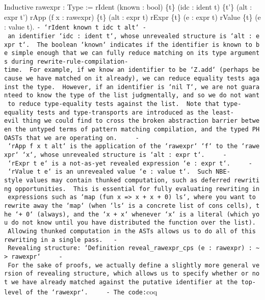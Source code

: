 Inductive rawexpr : Type := \textbar{} rIdent (known : bool) \{t\} (idc
: ident t) \{t'\} (alt : expr t') \textbar{} rApp (f x : rawexpr) \{t\}
(alt : expr t) \textbar{} rExpr \{t\} (e : expr t) \textbar{} rValue
\{t\} (e : value t).
\texttt{-\ `rIdent\ known\ t\ idc\ t\textquotesingle{}\ alt`\ -\ an\ identifier\ `idc\ :\ ident\ t`,\ whose\ unrevealed\ structure\ is\ `alt\ :\ expr\ t\textquotesingle{}`.\ \ The\ boolean\ `known`\ indicates\ if\ the\ identifier\ is\ known\ to\ be\ simple\ enough\ that\ we\ can\ fully\ reduce\ matching\ on\ its\ type\ arguments\ during\ rewrite-rule-compilation-time.\ \ For\ example,\ if\ we\ know\ an\ identifier\ to\ be\ `Z.add`\ (perhaps\ because\ we\ have\ matched\ on\ it\ already),\ we\ can\ reduce\ equality\ tests\ against\ the\ type.\ \ However,\ if\ an\ identifier\ is\ `nil\ T`,\ we\ are\ not\ guaranteed\ to\ know\ the\ type\ of\ the\ list\ judgmentally,\ and\ so\ we\ do\ not\ want\ to\ reduce\ type-equality\ tests\ against\ the\ list.\ \ Note\ that\ type-equality\ tests\ and\ type-transports\ are\ introduced\ as\ the\ least-evil\ thing\ we\ could\ find\ to\ cross\ the\ broken\ abstraction\ barrier\ between\ the\ untyped\ terms\ of\ pattern\ matching\ compilation,\ and\ the\ typed\ PHOASTs\ that\ we\ are\ operating\ on.\ \ \ \ \ -\ `rApp\ f\ x\ t\ alt`\ is\ the\ application\ of\ the\ `rawexpr`\ `f`\ to\ the\ `rawexpr`\ `x`,\ whose\ unrevealed\ structure\ is\ `alt\ :\ expr\ t`.\ \ \ \ \ -\ `rExpr\ t\ e`\ is\ a\ not-as-yet\ revealed\ expression\ `e\ :\ expr\ t`.\ \ \ \ \ -\ `rValue\ t\ e`\ is\ an\ unrevealed\ value\ `e\ :\ value\ t`.\ \ Such\ NBE-style\ values\ may\ contain\ thunked\ computation,\ such\ as\ deferred\ rewriting\ opportunities.\ \ This\ is\ essential\ for\ fully\ evaluating\ rewriting\ in\ expressions\ such\ as\ `map\ (fun\ x\ =\textgreater{}\ x\ +\ x\ +\ 0)\ ls`,\ where\ you\ want\ to\ rewrite\ away\ the\ `map`\ (when\ `ls`\ is\ a\ concrete\ list\ of\ cons\ cells),\ the\ `+\ 0`\ (always),\ and\ the\ `x\ +\ x`\ whenever\ `x`\ is\ a\ literal\ (which\ you\ do\ not\ know\ until\ you\ have\ distributed\ the\ function\ over\ the\ list).\ \ Allowing\ thunked\ computation\ in\ the\ ASTs\ allows\ us\ to\ do\ all\ of\ this\ rewriting\ in\ a\ single\ pass.\ \ \ -\ Revealing\ structure:\ `Definition\ reveal\_rawexpr\_cps\ (e\ :\ rawexpr)\ :\ \textasciitilde{}\textgreater{}\ rawexpr`\ \ \ \ \ -\ For\ the\ sake\ of\ proofs,\ we\ actually\ define\ a\ slightly\ more\ general\ version\ of\ revealing\ structure,\ which\ allows\ us\ to\ specify\ whether\ or\ not\ we\ have\ already\ matched\ against\ the\ putative\ identifier\ at\ the\ top-level\ of\ the\ `rawexpr`.\ \ \ \ \ -\ The\ code:}coq
